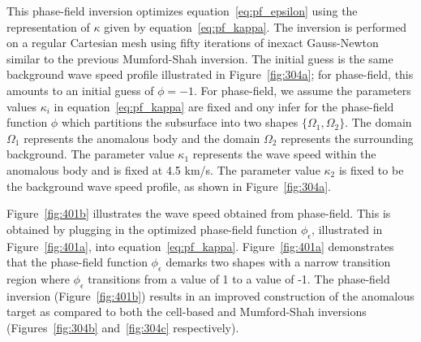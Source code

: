 \documentclass[manuscript,revised]{geophysics}
\begin{document}
This phase-field inversion optimizes equation~\ref{eq:pf_epsilon} using the representation of $\kappa$ given by equation~\ref{eq:pf_kappa}. The inversion is performed on a regular Cartesian mesh using fifty iterations of inexact Gauss-Newton similar to the previous Mumford-Shah inversion. The initial guess is the same background wave speed profile illustrated in Figure~\ref{fig:304a}; for phase-field, this amounts to an initial guess of $\phi=-1$.  For phase-field, we assume the parameters values $\kappa_i$ in equation~\ref{eq:pf_kappa} are fixed and ony infer for the phase-field function $\phi$ which partitions the subsurface into two shapes $\{\Omega_1,\Omega_2 \}$. The domain $\Omega_1$ represents the anomalous body and the domain $\Omega_2$ represents the surrounding background. The parameter value $\kappa_1$ represents the wave speed within the anomalous body and is fixed at 4.5 km/s. The parameter value $\kappa_2$ is fixed to be the background wave speed profile, as shown in Figure~\ref{fig:304a}.

Figure~\ref{fig:401b} illustrates the wave speed obtained from phase-field.  This is obtained by plugging in the optimized phase-field function $\phi_\epsilon$, illustrated in Figure~\ref{fig:401a}, into equation~\ref{eq:pf_kappa}.  Figure~\ref{fig:401a} demonstrates that the phase-field function $\phi_\epsilon$ demarks two shapes with a narrow transition region where $\phi_\epsilon$ transitions from a value of 1 to a value of -1. The phase-field inversion (Figure~\ref{fig:401b}) results in an improved construction of the anomalous target as compared to both the cell-based and Mumford-Shah inversions (Figures~\ref{fig:304b} and~\ref{fig:304c} respectively).
\end{document}
